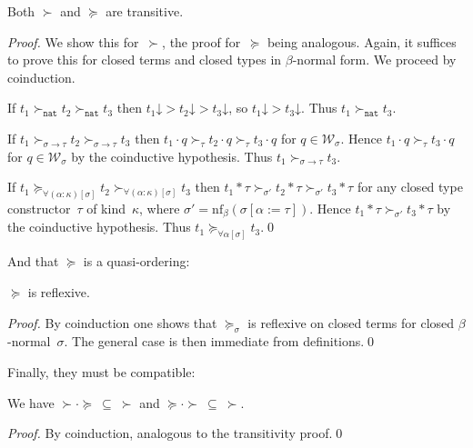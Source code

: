 \documentclass[runningheads,a4paper]{llncs}
\newcommand{\World}{\mathcal{W}}
\newcommand{\nf}{\mathrm{nf}}
\newcommand{\arrtype}{\rightarrow}
\newcommand{\app}[2]{#1 \cdot #2}
\newcommand{\tapp}[2]{#1 * #2}
\newcommand{\subst}[2]{#1:=#2}
\newcommand{\nat}{\mathtt{nat}}
\newcommand{\da}{\mathord{\downarrow}}
\begin{document}
\begin{lemma}
  Both $\succ$ and $\succeq$ are transitive.
\end{lemma}

\begin{proof}
  We show this for~$\succ$, the proof for~$\succeq$ being
  analogous. Again, it suffices to prove this for closed terms and
  closed types in $\beta$-normal form. We proceed by coinduction.

  If $t_1 \succ_\nat t_2 \succ_\nat t_3$ then $t_1\da > t_2\da >
  t_3\da$, so $t_1\da > t_3\da$. Thus $t_1 \succ_\nat t_3$.

  If $t_1 \succ_{\sigma\arrtype\tau}t_2\succ_{\sigma\arrtype\tau}t_3$
  then $\app{t_1}{q}\succ_{\tau}\app{t_2}{q}\succ_\tau\app{t_3}{q}$
  for $q \in \World_\sigma$. Hence
  $\app{t_1}{q}\succ_\tau\app{t_3}{q}$ for $q \in \World_\sigma$ by
  the coinductive hypothesis. Thus $t_1\succ_{\sigma\arrtype\tau}
  t_3$.

  If $t_1
  \succeq_{\forall(\alpha:\kappa)[\sigma]}t_2\succ_{\forall(\alpha:\kappa)[\sigma]}t_3$
  then
  $\tapp{t_1}{\tau}\succ_{\sigma'}\tapp{t_2}{\tau}\succ_{\sigma'}\tapp{t_3}{\tau}$
  for any closed type constructor~$\tau$ of kind~$\kappa$, where
  $\sigma' = \nf_\beta(\sigma[\subst{\alpha}{\tau}])$. Hence
  $\tapp{t_1}{\tau}\succ_{\sigma'}\tapp{t_3}{\tau}$ by the coinductive
  hypothesis. Thus $t_1\succeq_{\forall\alpha[\sigma]} t_3$.\qed
\end{proof}

And that $\succeq$ is a quasi-ordering:

\begin{lemma}
  $\succeq$ is reflexive.
\end{lemma}

\begin{proof}
  By coinduction one shows that $\succeq_\sigma$ is reflexive on
  closed terms for closed $\beta$-normal~$\sigma$. The general case is
  then immediate from definitions.\qed
\end{proof}

Finally, they must be compatible:

\begin{lemma}\label{lem:compatibility}
  We have $\succ \cdot \succeq\ \subseteq\ \succ$ and $\succeq \cdot
  \succ\ \subseteq\ \succ$.
\end{lemma}

\begin{proof}
  By coinduction, analogous to the transitivity proof.\qed
\end{proof}
\end{document}
